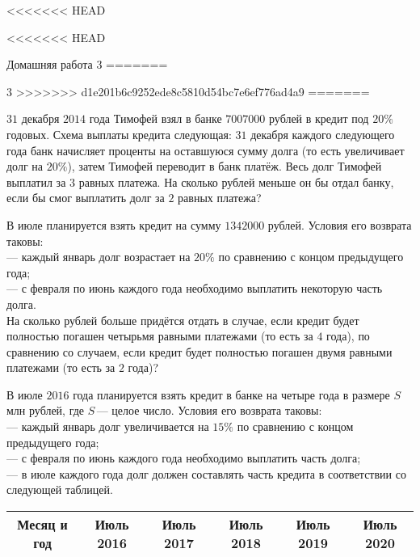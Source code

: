 <<<<<<< HEAD
\begin{homework}[number=3]
	\begin{listofex}
<<<<<<< HEAD
		\item Домашняя работа 3
=======
\begin{homework}[number=2]
	\begin{listofex}
		\item 3
>>>>>>> d1e201b6c9252ede8c5810d54bc7e6ef776ad4a9
=======
		\item \( 31 \) декабря \( 2014 \) года Тимофей взял в банке \( 7 007 000  \) рублей в кредит под \( 20\% \) годовых. Схема выплаты кредита следующая: \( 31 \) декабря каждого следующего года банк начисляет проценты на оставшуюся сумму долга (то есть увеличивает долг на \( 20\% \)), затем Тимофей переводит в банк платёж. Весь долг Тимофей выплатил за \( 3 \) равных платежа. На сколько рублей меньше он бы отдал банку, если бы смог выплатить долг за \( 2 \) равных платежа?
		\item В июле планируется взять кредит на сумму \( 1 342 000 \) рублей. Условия его возврата таковы:\\
		--- каждый январь долг возрастает на \( 20\% \) по сравнению с концом предыдущего года;\\		
		--- с февраля по июнь каждого года необходимо выплатить некоторую часть долга.\\		
		На сколько рублей больше придётся отдать в случае, если кредит будет полностью погашен четырьмя равными платежами (то есть за \( 4 \) года), по сравнению со случаем, если кредит будет полностью погашен двумя равными платежами (то есть за \( 2 \) года)?
		\item В июле \( 2016 \) года планируется взять кредит в банке на четыре года в размере \( S \) млн рублей, где \( S \) --- целое число. Условия его возврата таковы:\\		
		--- каждый январь долг увеличивается на \( 15\% \) по сравнению с концом предыдущего года;\\		
		--- с февраля по июнь каждого года необходимо выплатить часть долга;\\		
		--- в июле каждого года долг должен составлять часть кредита в соответствии со следующей таблицей.
		\begin{table}[h]
			\begin{tabular}{llllll}
				\hline
				\multicolumn{1}{|c|}{Месяц и год}         & \multicolumn{1}{c|}{Июль 2016} & \multicolumn{1}{c|}{Июль 2017} & \multicolumn{1}{c|}{Июль 2018} & \multicolumn{1}{c|}{Июль 2019} & \multicolumn{1}{c|}{Июль 2020} \\ \hline

\end{tabular}
\end{table}
\end{listofex}
\end{homework}
\end{listofex}
\end{homework}
